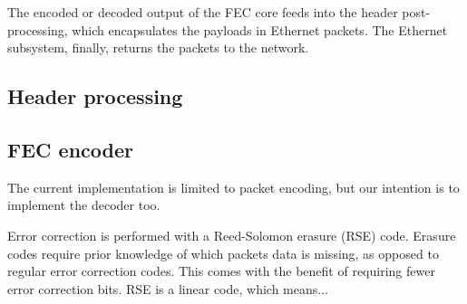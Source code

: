 The encoded or decoded output of the FEC core feeds into the header
post-processing, which encapsulates the payloads in Ethernet packets.  The
Ethernet subsystem, finally, returns the packets to the network.

\subsection{Header processing}

\subsection{FEC encoder}

The current implementation is limited to packet encoding, but our intention is
to implement the decoder too.

Error correction is performed with a Reed-Solomon erasure (RSE) code.  Erasure codes
require prior knowledge of which packets data is missing, as opposed to regular
error correction codes.  This comes with the benefit of requiring fewer error
correction bits.  RSE is a linear code, which means...

